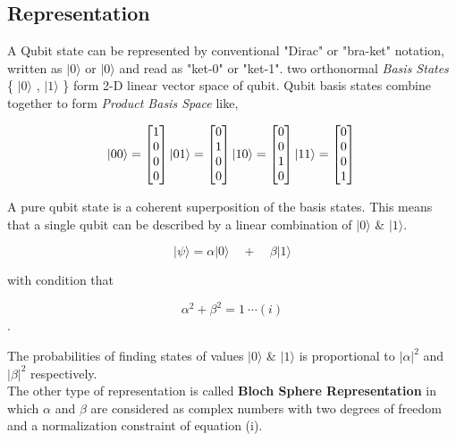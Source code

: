 \subsection{Representation}
A Qubit state can be represented by conventional "Dirac" or "bra-ket" notation, written as $|0\rangle$ or $|0\rangle$ and read as "ket-0" or "ket-1". two orthonormal \textit{Basis States} \{ $|0\rangle$ , $|1\rangle$ \} form 2-D linear vector space of qubit. Qubit basis states combine together to form \textit{Product Basis Space} like,

\[ |00\rangle = \begin{bmatrix} 1 \\ 0 \\ 0 \\ 0 \end{bmatrix} \quad \\
   |01\rangle = \begin{bmatrix} 0 \\ 1 \\ 0 \\ 0 \end{bmatrix} \quad \\
   |10\rangle = \begin{bmatrix} 0 \\ 0 \\ 1 \\ 0 \end{bmatrix} \quad \\
   |11\rangle = \begin{bmatrix} 0 \\ 0 \\ 0 \\ 1 \end{bmatrix} \quad \\
\]

A pure qubit state is a coherent superposition of the basis states. This means that a single qubit can be described by a linear combination of $|0\rangle$ \& $|1\rangle$.

\[|\psi\rangle = \alpha|0\rangle \quad +\quad \beta|1\rangle\]

with condition that 

\[\alpha^2 + \beta^2 = 1\ \cdots (i) \].

The probabilities of finding states of values $|0\rangle$ \& $|1\rangle$ is proportional to $|\alpha|^2$ and $|\beta|^2$ respectively.\\

The other type of representation is called \textbf{Bloch Sphere Representation} in which $\alpha$ and $\beta$ are considered as complex numbers with two degrees of freedom and a normalization constraint of equation (i). 

